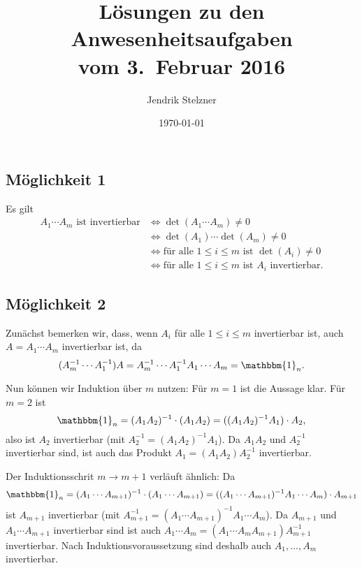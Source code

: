 \documentclass[a4paper,10pt]{article}
\title{Lösungen zu den \\ An\-we\-sen\-heits\-auf\-ga\-ben \\ vom 3.\ Februar 2016}
\author{Jendrik Stelzner}
\date{\today}
\begin{document}
\maketitle





\section{}



\subsection*{Möglichkeit 1}
Es gilt
\begin{align*}
 \text{$A_1 \dotsm A_m$ ist invertierbar}
 &\iff \det(A_1 \dotsm A_m) \neq 0 \\
 &\iff \det(A_1) \dotsm \det(A_m) \neq 0 \\
 &\iff \text{für alle $1 \leq i \leq m$ ist $\det(A_i) \neq 0$} \\
 &\iff \text{für alle $1 \leq i \leq m$ ist $A_i$ invertierbar}.
\end{align*}



\subsection*{Möglichkeit 2}
Zunächst bemerken wir, dass, wenn $A_i$ für alle $1 \leq i \leq m$ invertierbar ist, auch $A = A_1 \dotsm A_m$ invertierbar ist, da
\[
 (A_m^{-1} \dotsm A_1^{-1}) A
 = A_m^{-1} \dotsm A_1^{-1} A_1 \dotsm A_m
 = \mathbbm{1}_n.
\]

Nun können wir Induktion über $m$ nutzen: Für $m = 1$ ist die Aussage klar. Für $m = 2$ ist
\[
 \mathbbm{1}_n
 = (A_1 A_2)^{-1} \cdot (A_1 A_2)
 = ((A_1 A_2)^{-1} A_1) \cdot A_2,
\]
also ist $A_2$ invertierbar (mit $A_2^{-1} = (A_1 A_2)^{-1} A_1$). Da $A_1 A_2$ und $A_2^{-1}$ invertierbar sind, ist auch das Produkt $A_1 = (A_1 A_2) A_2^{-1}$ invertierbar.

Der Induktionsschrit $m \to m+1$ verläuft ähnlich: Da
\[
 \mathbbm{1}_n
 = (A_1 \dotsm A_{m+1})^{-1} \cdot (A_1 \dotsm A_{m+1})
 = ((A_1 \dotsm A_{m+1})^{-1} A_1 \dotsm A_m) \cdot A_{m+1}
\]
ist $A_{m+1}$ invertierbar (mit $A_{m+1}^{-1} = (A_1 \dotsm A_{m+1})^{-1} A_1 \dotsm A_m$). Da $A_{m+1}$ und $A_1 \dotsm A_{m+1}$ invertierbar sind ist auch $A_1 \dotsm A_m = (A_1 \dotsm A_m A_{m+1}) A_{m+1}^{-1}$ invertierbar. Nach Induktionsvoraussetzung sind deshalb auch $A_1, \dotsc, A_m$ invertierbar.
\end{document}
